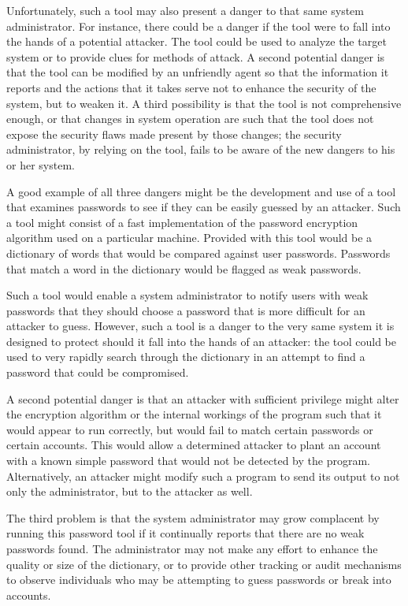 Unfortunately, such a tool may also present a danger to that same 
system administrator.   For instance, there could be a danger if the
tool were to fall into the hands of a potential attacker.  The tool could 
be used to analyze the target system or to provide clues for methods 
of attack.  A second potential danger is that the tool can be modified 
by an unfriendly agent so that the information it reports and the 
actions that it takes serve not to enhance the security of the system, 
but to weaken it.  A third possibility is that the tool is not 
comprehensive enough, or that changes in system operation are such 
that the tool does not expose the security flaws made present by 
those changes; the security administrator, by relying on the
tool, fails to be aware of the new dangers to his or her system.

A good example of all three dangers might be the development and use
of a tool that examines passwords to see if they can be easily guessed
by an attacker.  Such a tool might consist of a fast implementation of
the password encryption algorithm used on a particular machine.
Provided with this tool would be a dictionary of words that would be
compared against user passwords.  Passwords that match a word in the
dictionary would be flagged as weak passwords.

Such a tool would enable a system administrator to notify users with
weak passwords that they should choose
a password that is more difficult for an attacker to guess.  However,
such a tool is a danger to the very same system it is designed to
protect should it fall into the hands of an attacker: the tool could
be used to very rapidly search through the dictionary in an attempt to
find a password that could be compromised.

A second potential danger is that an attacker with sufficient privilege 
might alter the encryption algorithm or the internal workings of the 
program such that it would appear to run correctly, but would fail to 
match certain passwords or certain accounts.  This would allow a
determined attacker to plant an account with a known simple 
password that would not be detected by the program.  Alternatively, 
an attacker might modify such a program to send its output to not only the
administrator, but to the attacker as well.

The third problem is that the system administrator 
may grow complacent by running this password tool if it continually reports 
that there are no weak passwords found.  The administrator may not make 
any effort to enhance the quality or size of the dictionary, or to 
provide other tracking or audit mechanisms to observe individuals 
who may be attempting to guess passwords or break into accounts.  

